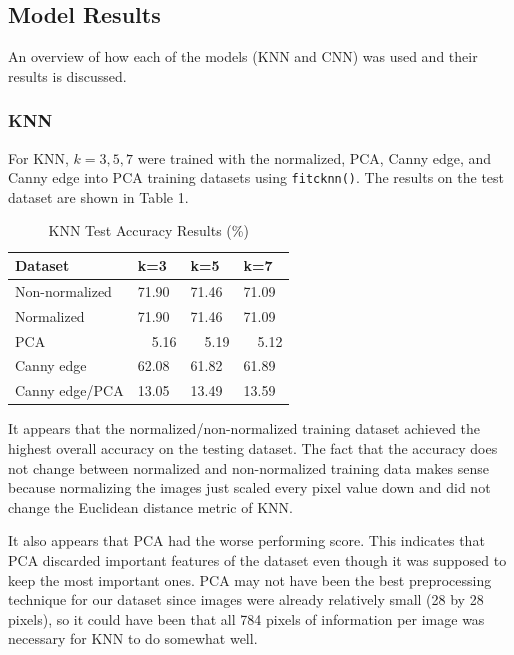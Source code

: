 \documentclass{article}
\begin{document}
\subsection{Model Results}

An overview of how each of the models (KNN and CNN) was used and their results
is discussed.

\subsubsection{KNN}
For KNN, \(k=3,5,7\) were trained with the normalized, PCA, Canny edge, and
Canny edge into PCA training datasets using \texttt{fitcknn()}. The results on
the test dataset are shown in Table 1.

\begin{table}[h]
  \caption{KNN Test Accuracy Results (\%)}
  \centering
  \begin{tabular}{llll}
    \toprule
    Dataset & k=3 & k=5 & k=7 \\
    \midrule
    Non-normalized & 71.90 & 71.46 & 71.09\\
    Normalized & 71.90 & 71.46 & 71.09 \\
    PCA & \ \ 5.16 & \ \ 5.19 & \ \ 5.12 \\
    Canny edge & 62.08 & 61.82 & 61.89\\
    Canny edge/PCA & 13.05 & 13.49 & 13.59\\
    \bottomrule
  \end{tabular}
\end{table}

It appears that the normalized/non-normalized training dataset achieved the
highest overall accuracy on the testing dataset. The fact that the accuracy does
not change between normalized and non-normalized training data makes sense
because normalizing the images just scaled every pixel value down and did not
change the Euclidean distance metric of KNN.

It also appears that PCA had the worse performing score. This indicates that PCA
discarded important features of the dataset even though it was supposed to keep
the most important ones. PCA may not have been the best preprocessing technique
for our dataset since images were already relatively small (28 by 28 pixels), so
it could have been that all 784 pixels of information per image was necessary
for KNN to do somewhat well.
\end{document}
